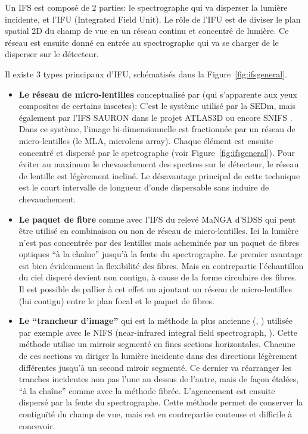 \documentclass[../main/main.tex]{subfiles}
\begin{document}
Un IFS est composé de 2 parties: le spectrographe qui va disperser la
lumière incidente, et l'IFU (Integrated Field Unit). Le rôle de l'IFU
est de diviser le plan spatial 2D du champ de vue en un réseau continu
et concentré de lumière. Ce réseau est ensuite donné en entrée au
spectrographe qui va se charger de le disperser sur le détecteur.

Il existe 3 types principaux d'IFU, schématisés dans la Figure~\ref{fig:ifsgeneral}.
\begin{itemize}[label=$\bullet$]
\itemsep0em 
\item \textbf{Le réseau de micro-lentilles} conceptualisé par
  \citet{BaconIFUlens} (qui s'apparente aux yeux composites
  de certains insectes): C'est le système utilisé par la SEDm, mais
  également par l'IFS SAURON \citep{SAURONifs} dans le projet ATLAS3D
  \citep{ATLAS3D} ou encore SNIFS \citep{SNIFS2004}. Dans ce système,
  l'image bi-dimensionnelle est fractionnée par un réseau de
  micro-lentilles (le MLA, microlens array). Chaque élément est ensuite
  concentré et dispersé par le spetrographe (voir
  Figure~\ref{fig:ifsgeneral}). Pour éviter au maximum le chevauchement des
  spectres sur le détecteur, le réseau de lentille est légèrement
  incliné. Le désavantage principal de cette technique est le court
  intervalle de longueur d'onde dispersable sans induire de chevauchement.
  
\item \textbf{Le paquet de fibre} comme
  avec l'IFS du relevé MaNGA d'SDSS \citep{SDSSIFS} qui peut
  être utilisé en combinaison \citep{BardenIFUfiber} ou non
  \citep{allingtonIFUlensfiber} de réseau de micro-lentilles.
  Ici la lumière n'est pas concentrée par des lentilles mais acheminée
  par un paquet de fibres optiques ``à la chaîne'' jusqu'à la fente du spectrographe. Le
  premier avantage est bien évidemment la flexibilité des fibres. Mais
  en contrepartie l'échantillon du ciel disperé devient non contigu, à
  cause de la forme circulaire des fibres. Il est possible de pallier à
  cet effet un ajoutant un réseau de micro-lentilles (lui contigu) entre
  le plan focal et le paquet de fibres.  
  
\item \textbf{Le ``trancheur d'image''} qui est la méthode la plus
  ancienne (\citet{BowenIFUslicer}, \citet{ContentIFUslicer}) utilisée
  par exemple avec le NIFS
  (near-infrared integral field spectrograph, \citet{GeminiNIFS}). Cette
  méthode utilise un mirroir segmenté en fines sections
  horizontales. Chacune de ces sections va diriger la lumière incidente
  dans des directions légèrement différentes jusqu'à un second miroir
  segmenté. Ce dernier va réarranger les tranches incidentes non pas
  l'une au dessus de l'autre, mais de façon étalées, ``à la chaîne''
  comme avec la méthode fibrée. L'agencement est ensuite dispersé par la
  fente du spectrographe. Cette méthode permet de conserver la
  contiguïté du champ de vue, mais est en contrepartie couteuse et
  difficile à concevoir.
\end{itemize}
\end{document}

